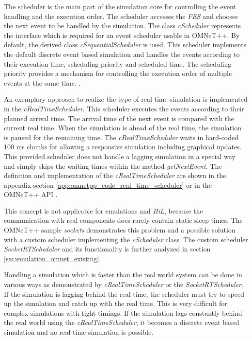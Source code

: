 The scheduler is the main part of the simulation core for controlling the event handling and the execution order.
The scheduler accesses the \emph{FES} and chooses the next event to be handled by the simulation.
The class \emph{cScheduler} represents the interface which is required for an event scheduler usable in OMNeT++.
By default, the derived class \emph{cSequentialScheduler} is used.
This scheduler implements the default discrete event based simulation and handles the events according to their execution time, scheduling priority and scheduled time.
The scheduling priority provides a mechanism for controlling the execution order of multiple events at the same time. \cite[section 4.1]{omnet_manual}.

An exemplary approach to realize the type of real-time simulation is implemented in the \emph{cRealTimeScheduler}.
This scheduler executes the events according to their planned arrival time.
The arrival time of the next event is compared with the current real time.
When the simulation is ahead of the real time, the simulation is paused for the remaining time.
The \emph{cRealTimeScheduler} waits in hard-coded 100 ms chunks for allowing a responsive simulation including graphical updates.
This provided scheduler does not handle a lagging simulation in a special way and simply skips the waiting times within the method \emph{getNextEvent}. 
The definition and implementation of the \emph{cRealTimeScheduler} are shown in the appendix section \ref{app:omnetpp_code_real_time_scheduler} or in the OMNeT++ API \cite[cRealTimeScheduler]{omnet_api}.

This concept is not applicable for emulations and \emph{HiL}, because the communication with real components does rarely contain static sleep times.
The OMNeT++ sample \emph{sockets} demonstrates this problem and a possible solution with a custom scheduler implementing the \emph{cScheduler} class.
The custom scheduler \emph{SocketRTScheduler} and its functionality is further analyzed in section \ref{sec:emulation_omnet_existing}.

Handling a simulation which is faster than the real world system can be done in various ways as demonstrated by \emph{cRealTimeScheduler} or the \emph{SocketRTScheduler}.
If the simulation is lagging behind the real-time, the scheduler must try to speed up the simulation and catch up with the real time.
This is very difficult for complex simulations with tight timings.
If the simulation lags constantly behind the real world using the \emph{cRealTimeScheduler}, it becomes a discrete event based simulation and no real-time simulation is possible.


